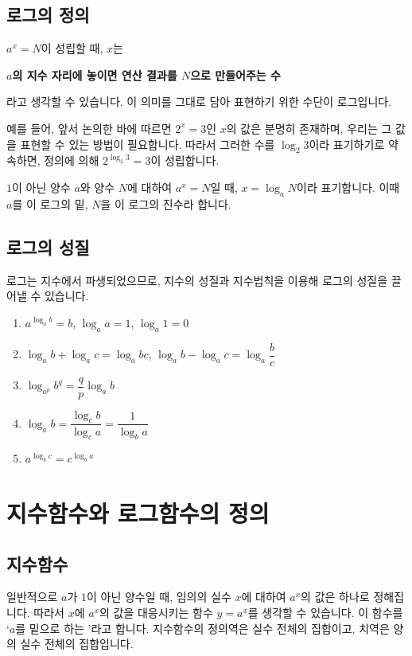 \subsection{로그의 정의}
$a^x = N$이 성립할 때, $x$는\begin{center}
  \textbf{\color{cyan}$a$의 지수 자리에 놓이면 연산 결과를 $N$으로 만들어주는 수}
\end{center}라고 생각할 수 있습니다. 이 의미를 그대로 담아 표현하기 위한 수단이 로그입니다.

예를 들어, 앞서 논의한 바에 따르면 $2^x=3$인 $x$의 값은 분명히 존재하며, 우리는 그 값을 표현할 수 있는 방법이 필요합니다. 따라서 그러한 수를 $\log_2 3$이라 표기하기로 약속하면, 정의에 의해 $2^{\log_2 3} = 3$이 성립합니다.

$1$이 아닌 양수 $a$와 양수 $N$에 대하여 $a^x = N$일 때, $x = \log _a N$이라 표기합니다. 이때 $a$를 이 로그의 밑, $N$을 이 로그의 진수라 합니다.
\subsection{로그의 성질}
로그는 지수에서 파생되었으므로, 지수의 성질과 지수법칙을 이용해 로그의 성질을 끌어낼 수 있습니다.
\begin{enumerate}[label=\onum*]
  \item $a ^{\log_a b} = b$, $\log_a a = 1$, $\log_a 1 = 0$
  \item $\log_a b + \log_a c = \log_a bc$, $\log_a b - \log_a c = \log_a \dfrac{b}{c}$
  \item $\log_{a^p} b^q = \dfrac{q}{p}\log_a b$
  \item $\log_a b = \dfrac{\log_c b}{\log_c a} = \dfrac{1}{\log_b a}$
  \item $a ^{\log_b c} = c^{\log_b a}$
\end{enumerate}



\clearpage


\section{지수함수와 로그함수의 정의}
\subsection{지수함수}
일반적으로 $a$가 $1$이 아닌 양수일 때, 임의의 실수 $x$에 대하여 $a^x$의 값은 하나로 정해집니다. 따라서 $x$에 $a^x$의 값을 대응시키는 함수 $y=a^x$를 생각할 수 있습니다. 이 함수를 `$a$를 밑으로 하는 '라고 합니다. 지수함수의 정의역은 실수 전체의 집합이고, 치역은 양의 실수 전체의 집합입니다.

